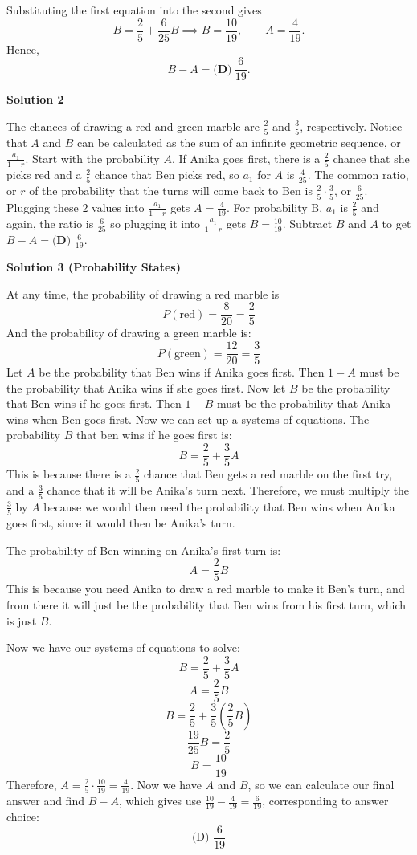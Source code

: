 \begin{enumerate}
 Substituting the first equation into the second gives
 \[B=\frac25+\frac6{25}B \implies B=\frac{10}{19},\qquad A=\frac4{19}.\]Hence,
 \[B-A=\boxed{\textbf{(D)}\ \frac6{19}}.\]




\textbf{Solution 2}

The chances of drawing a red and green marble are $\frac{2}{5}$ and $\frac{3}{5}$, respectively. Notice that $A$ and $B$ can be calculated as the sum of an infinite geometric sequence, or $\frac{a_1}{1-r}$. Start with the probability $A$. If Anika goes first, there is a $\frac{2}{5}$ chance that she picks red and a $\frac{2}{5}$ chance that Ben picks red, so $a_1$ for $A$ is $\frac{4}{25}$. The common ratio, or $r$ of the probability that the turns will come back to Ben is $\frac{2}{5} \cdot \frac{3}{5}$, or $\frac{6}{25}$. Plugging these 2 values into $\frac{a_1}{1-r}$ gets $A=\frac{4}{19}$. For probability B, $a_1$ is $\frac{2}{5}$ and again, the ratio is $\frac{6}{25}$ so plugging it into $\frac{a_1}{1-r}$ gets $B=\frac{10}{19}$. Subtract $B$ and $A$ to get $B-A=\boxed{\textbf{(D) } \frac{6}{19}}$.

 



\textbf{Solution 3 (Probability States)}

At any time, the probability of drawing a red marble is 
 \[P(\text{red})=\frac{8}{20}=\frac{2}{5}\]And the probability of drawing a green marble is:
 \[P(\text{green}) = \frac{12}{20}=\frac{3}{5}\]Let $A$ be the probability that Ben wins if Anika goes first. Then $1-A$ must be the probability that Anika wins if she goes first. Now let $B$ be the probability that Ben wins if he goes first. Then $1-B$ must be the probability that Anika wins when Ben goes first. Now we can set up a systems of equations. The probability $B$ that ben wins if he goes first is:
 \[B=\frac{2}{5}+\frac{3}{5}A\]This is because there is a $\frac{2}{5}$ chance that Ben gets a red marble on the first try, and a $\frac{3}{5}$ chance that it will be Anika's turn next. Therefore, we must multiply the $\frac{3}{5}$ by $A$ because we would then need the probability that Ben wins when Anika goes first, since it would then be Anika's turn.

 The probability of Ben winning on Anika's first turn is:
 \[A=\frac{2}{5} B\]This is because you need Anika to draw a red marble to make it Ben's turn, and from there it will just be the probability that Ben wins from his first turn, which is just $B$.

 Now we have our systems of equations to solve:
 \[B=\frac{2}{5}+\frac{3}{5}A\]
 \[A=\frac{2}{5}B\]
 \[B=\frac{2}{5}+\frac{3}{5}{\left(\frac{2}{5}B \right)}\]
 \[\frac{19}{25}B=\frac{2}{5}\]
 \[B=\frac{10}{19}\]Therefore, $A=\frac{2}{5} \cdot \frac{10}{19}=\frac{4}{19}$. Now we have $A$ and $B$, so we can calculate our final answer and find $B-A$, which gives use $\frac{10}{19}-\frac{4}{19}=\frac{6}{19}$, corresponding to answer choice:
 \[\boxed{\text{(D) } \frac{6}{19}}\]





\end{enumerate}
